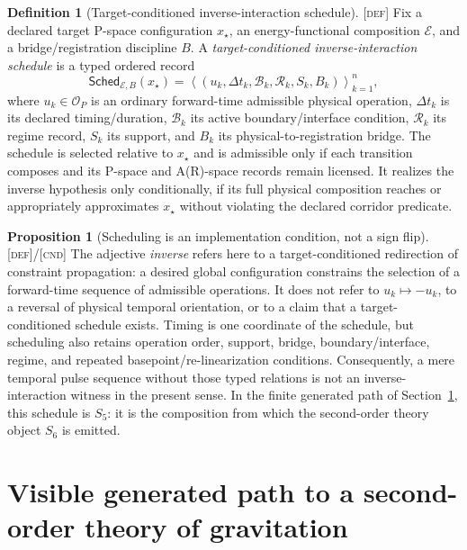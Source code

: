 \documentclass[11pt]{article}
\newcommand{\Sched}{\ensuremath{\mathsf{Sched}}}
\newcommand{\Defn}{\textsc{[def]}}
\newcommand{\Cnd}{\textsc{[cnd]}}
\theoremstyle{definition}
\newtheorem{sdefinition}{Definition}
\newtheorem{sproposition}{Proposition}
\begin{document}
\begin{sdefinition}[Target-conditioned inverse-interaction schedule]
\label{def:target-conditioned-schedule}
\Defn{} Fix a declared target P-space configuration $x_\star$, an
energy-functional composition $\mathcal E$, and a bridge/registration discipline
$B$. A \emph{target-conditioned inverse-interaction schedule} is a typed ordered
record
\begin{equation}
\Sched_{\mathcal E,B}(x_\star)=
\left\langle
(u_k,\Delta t_k,\mathcal B_k,\mathcal R_k,S_k,B_k)
\right\rangle_{k=1}^{n},
\label{eq:target-conditioned-schedule}
\end{equation}
where $u_k\in\mathcal O_P$ is an ordinary forward-time admissible physical
operation, $\Delta t_k$ is its declared timing/duration, $\mathcal B_k$ its active
boundary/interface condition, $\mathcal R_k$ its regime record, $S_k$ its support,
and $B_k$ its physical-to-registration bridge. The schedule is selected relative
to $x_\star$ and is admissible only if each transition composes and its P-space and
A(R)-space records remain licensed. It realizes the inverse hypothesis only
conditionally, if its full physical composition reaches or appropriately
approximates $x_\star$ without violating the declared corridor predicate.
\end{sdefinition}

\begin{sproposition}[Scheduling is an implementation condition, not a sign flip]
\label{prop:schedule-not-signflip}
\Defn{}/\Cnd{} The adjective \emph{inverse} refers here to a target-conditioned
redirection of constraint propagation: a desired global configuration constrains
the selection of a forward-time sequence of admissible operations. It does not
refer to $u_k\mapsto-u_k$, to a reversal of physical temporal orientation, or to a
claim that a target-conditioned schedule exists. Timing is one coordinate of the
schedule, but scheduling also retains operation order, support, bridge,
boundary/interface, regime, and repeated basepoint/re-linearization conditions.
Consequently, a mere temporal pulse sequence without those typed relations is not
an inverse-interaction witness in the present sense. In the finite generated path of
Section~\ref{supp:generated-path}, this schedule is $S_5$: it is the composition
from which the second-order theory object $S_6$ is emitted.
\end{sproposition}


\section{Visible generated path to a second-order theory of gravitation}
\label{supp:generated-path}
\end{document}
